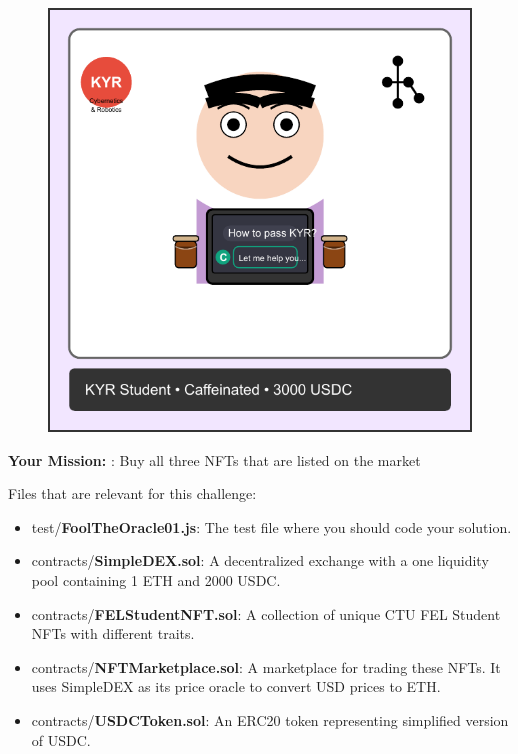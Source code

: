 \documentclass[12pt]{article}
\begin{document}
\begin{figure}[h!]
\begin{minipage}{0.3\textwidth}
  \end{minipage}
  \hfill
  \begin{minipage}{0.3\textwidth}
    \includegraphics[width=\textwidth]{NFTs/nft-caffeinated-kyr.pdf}
  \end{minipage}
\end{figure}

\medskip
\noindent
\textbf{Your Mission:} : Buy all three NFTs that are listed on the market

\noindent
Files that are relevant for this challenge:

\begin{itemize}
\item test/\textbf{FoolTheOracle01.js}: The test file where you should code your solution.
\item contracts/\textbf{SimpleDEX.sol}: A decentralized exchange with a one liquidity pool containing 1 ETH and 2000 USDC.
\item contracts/\textbf{FELStudentNFT.sol}: A collection of unique CTU FEL Student NFTs with different traits.
\item contracts/\textbf{NFTMarketplace.sol}: A marketplace for trading these NFTs. It uses SimpleDEX as its price oracle to convert USD prices to ETH.
\item contracts/\textbf{USDCToken.sol}: An ERC20 token representing simplified version of USDC.
\end{itemize}
\end{document}
